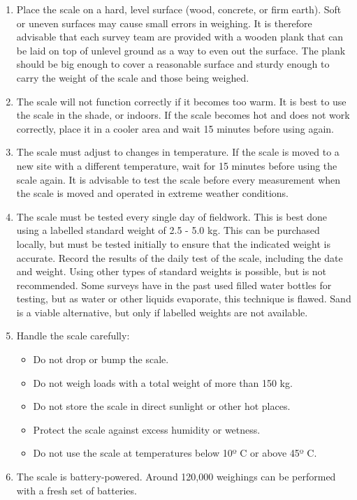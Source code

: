 \documentclass[12pt,]{book}
\providecommand{\tightlist}{%
  \setlength{\itemsep}{0pt}\setlength{\parskip}{0pt}}
\begin{document}
\begin{enumerate}
\def\labelenumi{\arabic{enumi}.}
\item
  Place the scale on a hard, level surface (wood, concrete, or firm
  earth). Soft or uneven surfaces may cause small errors in weighing. It
  is therefore advisable that each survey team are provided with a
  wooden plank that can be laid on top of unlevel ground as a way to
  even out the surface. The plank should be big enough to cover a
  reasonable surface and sturdy enough to carry the weight of the scale
  and those being weighed.
\item
  The scale will not function correctly if it becomes too warm. It is
  best to use the scale in the shade, or indoors. If the scale becomes
  hot and does not work correctly, place it in a cooler area and wait 15
  minutes before using again.
\item
  The scale must adjust to changes in temperature. If the scale is moved
  to a new site with a different temperature, wait for 15 minutes before
  using the scale again. It is advisable to test the scale before every
  measurement when the scale is moved and operated in extreme weather
  conditions.
\item
  The scale must be tested every single day of fieldwork. This is best
  done using a labelled standard weight of 2.5 - 5.0 kg. This can be
  purchased locally, but must be tested initially to ensure that the
  indicated weight is accurate. Record the results of the daily test of
  the scale, including the date and weight. Using other types of
  standard weights is possible, but is not recommended. Some surveys
  have in the past used filled water bottles for testing, but as water
  or other liquids evaporate, this technique is flawed. Sand is a viable
  alternative, but only if labelled weights are not available.
\item
  Handle the scale carefully:

  \begin{itemize}
  \tightlist
  \item
    Do not drop or bump the scale.
  \item
    Do not weigh loads with a total weight of more than 150 kg.
  \item
    Do not store the scale in direct sunlight or other hot places.
  \item
    Protect the scale against excess humidity or wetness.
  \item
    Do not use the scale at temperatures below 10º C or above 45º C.
  \end{itemize}
\item
  The scale is battery-powered. Around 120,000 weighings can be
  performed with a fresh set of batteries.
\end{enumerate}
\end{document}
